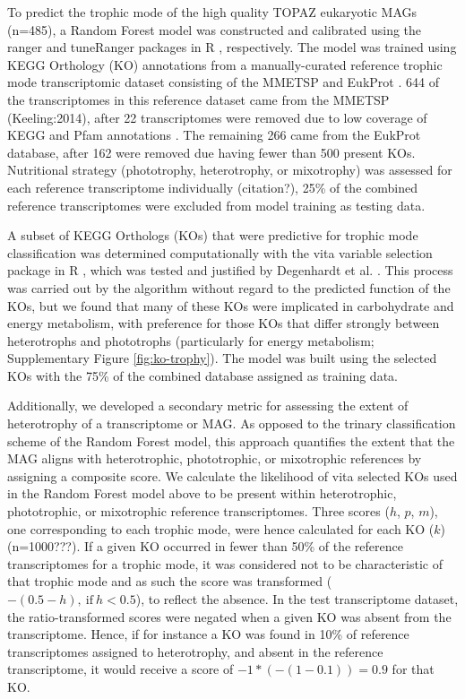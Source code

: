 \documentclass[12pt]{article}
\numberwithin{equation}{section}
\begin{document}
To predict the trophic mode of the high quality TOPAZ eukaryotic MAGs (n=485), a Random Forest model \citep{Breiman_2001} was constructed and calibrated using the ranger \citep{Wright_2017} and tuneRanger packages in R \citep{tuneRanger}, respectively. The model was trained using KEGG Orthology (KO) annotations \citep{Kanehisa_2019} from a manually-curated reference trophic mode transcriptomic dataset consisting of the MMETSP \citep{Keeling2014} and EukProt \citep{Richter2020EukProt}. 644 of the transcriptomes in this reference dataset came from the MMETSP (Keeling:2014), after 22 transcriptomes were removed due to low coverage of KEGG and Pfam annotations \citep{Finn2014Pfam}. The remaining 266 came from the EukProt database, after 162 were removed due having fewer than 500 present KOs. Nutritional strategy (phototrophy, heterotrophy, or mixotrophy) was assessed for each reference transcriptome individually (citation?), 25\% of the combined reference transcriptomes were excluded from model training as testing data. 

A subset of KEGG Orthologs (KOs) that were predictive for trophic mode classification was determined computationally with the vita variable selection package in R \citep{Janitza_2016}, which was tested and justified by Degenhardt et al. \citet{Degenhardt_2017}. This process was carried out by the algorithm without regard to the predicted function of the KOs, but we found that many of these KOs were implicated in carbohydrate and energy metabolism, with preference for those KOs that differ strongly between heterotrophs and phototrophs (particularly for energy metabolism; Supplementary Figure \ref{fig:ko-trophy}). The model was built using the selected KOs with the 75\% of the combined database assigned as training data.

Additionally, we developed a secondary metric for assessing the extent of heterotrophy of a transcriptome or MAG. As opposed to the trinary classification scheme of the Random Forest model, this approach quantifies the extent that the MAG aligns with heterotrophic, phototrophic, or mixotrophic references by assigning a composite score. We calculate the likelihood of vita selected KOs used in the Random Forest model above to be present within heterotrophic, phototrophic, or mixotrophic reference transcriptomes. Three scores ($h$, $p$, $m$), one corresponding to each trophic mode, were hence calculated for each KO ($k$) (n=1000???). If  a given KO occurred in fewer than 50\% of the reference transcriptomes for a trophic mode, it was considered not to be characteristic of that trophic mode and as such the score was transformed ($-(0.5 - h),\ \text{if} \ h<0.5$), to reflect the absence. In the test transcriptome dataset, the ratio-transformed scores were negated when a given KO was absent from the transcriptome. Hence, if for instance a KO was found in 10\% of reference transcriptomes assigned to heterotrophy, and absent in the reference transcriptome, it would receive a score of $-1 * (-(1-0.1)) = 0.9$ for that KO.
\end{document}
